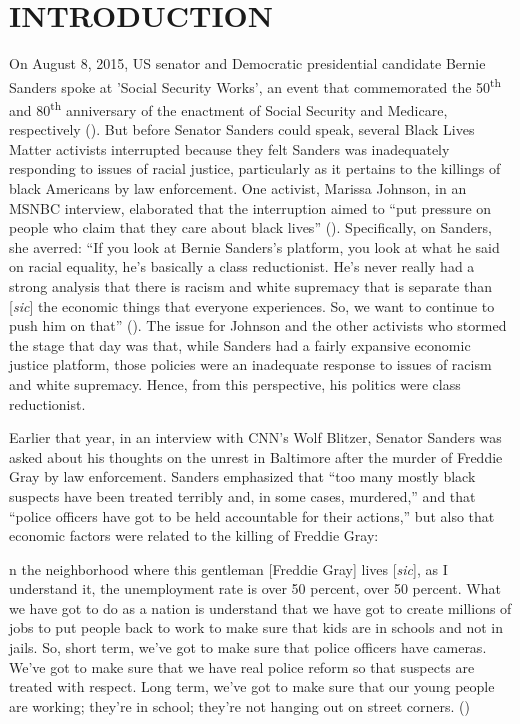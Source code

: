 \documentclass[12pt]{article}
\renewenvironment{quote}
  {\list{}{\leftmargin=\parindent\rightmargin=0pt}%
   \item\relax}
  {\endlist}
\begin{document}

\section{INTRODUCTION}

On August 8, 2015, US senator and Democratic presidential candidate Bernie Sanders spoke at 'Social Security Works', an event that commemorated the 50\textsuperscript{th} and 80\textsuperscript{th} anniversary of the enactment of Social Security and Medicare, respectively (\cite{wilsonProtestersShutBernie2015}). But before Senator Sanders could speak, several Black Lives Matter activists interrupted because they felt Sanders was inadequately responding to issues of racial justice, particularly as it pertains to the killings of black Americans by law enforcement. One activist, Marissa Johnson, in an MSNBC interview, elaborated that the interruption aimed to “put pressure on people who claim that they care about black lives” (\cite{hallBernieSandersBlack2015}). Specifically, on Sanders, she averred: “If you look at Bernie Sanders’s platform, you look at what he said on racial equality, he’s basically a class reductionist. He’s never really had a strong analysis that there is racism and white supremacy that is separate than [\textit{sic}] the economic things that everyone experiences. So, we want to continue to push him on that” (\cite{hallBernieSandersBlack2015}). The issue for Johnson and the other activists who stormed the stage that day was that, while Sanders had a fairly expansive economic justice platform, those policies were an inadequate response to issues of racism and white supremacy. Hence, from this perspective, his politics were class reductionist.

Earlier that year, in an interview with CNN’s Wolf Blitzer, Senator Sanders was asked about his thoughts on the unrest in Baltimore after the murder of Freddie Gray by law enforcement. Sanders emphasized that “too many mostly black suspects have been treated terribly and, in some cases, murdered,” and that “police officers have got to be held accountable for their actions,” but also that economic factors were related to the killing of Freddie Gray:

\begin{quote}
[I]n the neighborhood where this gentleman [Freddie Gray] lives [\textit{sic}], as I understand it, the unemployment rate is over 50 percent, over 50 percent. What we have got to do as a nation is understand that we have got to create millions of jobs to put people back to work to make sure that kids are in schools and not in jails. So, short term, we've got to make sure that police officers have cameras. We've got to make sure that we have real police reform so that suspects are treated with respect. Long term, we've got to make sure that our young people are working; they're in school; they're not hanging out on street corners. (\cite{sandersInterviewWolfBlitzer2015})
\end{quote}
\end{document}
